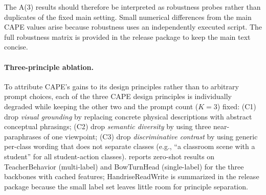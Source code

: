 \documentclass[symmetry,article,submit,pdftex,moreauthors]{Definitions/mdpi}
\begin{document}
The A(3) results should therefore be interpreted as robustness probes rather than duplicates of the fixed main setting. Small numerical differences from the main CAPE values arise because robustness uses an independently executed script. The full robustness matrix is provided in the release package to keep the main text concise.

\paragraph{Three-principle ablation.}
To attribute CAPE's gains to its design principles rather than to arbitrary prompt choices, each of the three CAPE design principles is individually degraded while keeping the other two and the prompt count ($K=3$) fixed: (\textsc{C1}) drop \emph{visual grounding} by replacing concrete physical descriptions with abstract conceptual phrasings; (\textsc{C2}) drop \emph{semantic diversity} by using three near-paraphrases of one viewpoint; (\textsc{C3}) drop \emph{discriminative contrast} by using generic per-class wording that does not separate classes (e.g., ``a classroom scene with a student'' for all student-action classes).  reports zero-shot results on TeacherBehavior (multi-label) and BowTurnHead (single-label) for the three backbones with cached features; HandriseReadWrite is summarized in the release package because the small label set leaves little room for principle separation.
\end{document}
